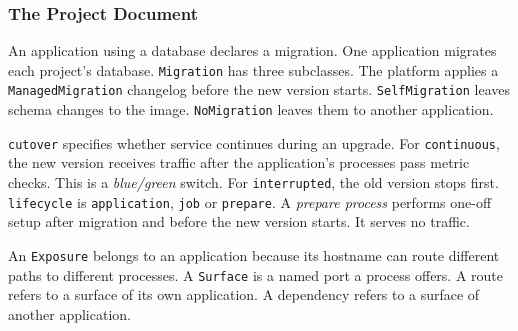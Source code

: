 \subsubsection{The Project Document}

An application using a database declares a migration. One application migrates
each project's database. \texttt{Migration} has three subclasses. The platform
applies a \texttt{ManagedMigration} changelog before the new version starts.
\texttt{SelfMigration} leaves schema changes to the image.
\texttt{NoMigration} leaves them to another application.

\texttt{cutover} specifies whether service continues during an upgrade. For
\texttt{continuous}, the new version receives traffic after the application's
processes pass metric checks. This is a \emph{blue/green} switch. For
\texttt{interrupted}, the old version stops first. \texttt{lifecycle} is
\texttt{application}, \texttt{job} or \texttt{prepare}. A \emph{prepare process}
performs one-off setup after migration and before the new version starts. It
serves no traffic.

An \texttt{Exposure} belongs to an application because its hostname can route
different paths to different processes. A \texttt{Surface} is a named port a
process offers. A route refers to a surface of its own application. A
dependency refers to a surface of another application.

